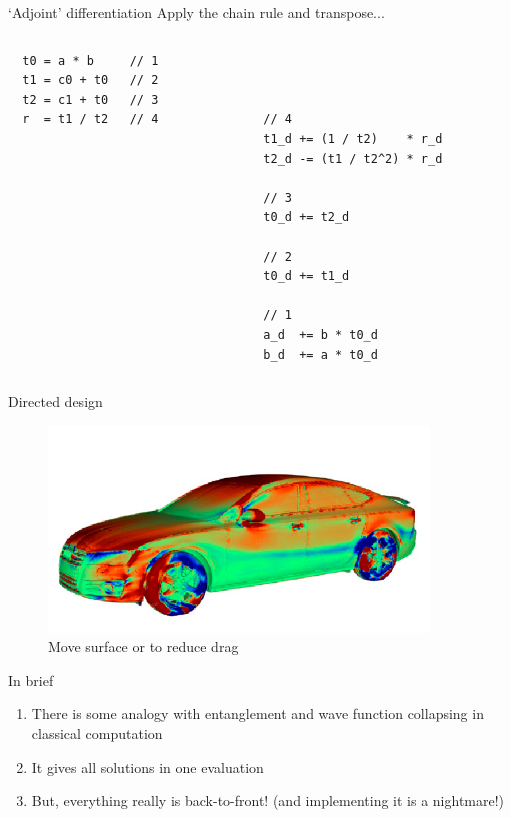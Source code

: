 \documentclass[xcolor=dvipsnames]{beamer}
\def\redcolor{\color{red}}
\def\bluecolor{\color{blue}}
\begin{document}
\begin{frame}[fragile]{`Adjoint' differentiation}
  Apply the chain rule and transpose...
  \begin{columns}[T] %
    \begin{column}{.49\textwidth}
      \begin{lstlisting}
  t0 = a * b     // 1
  t1 = c0 + t0   // 2
  t2 = c1 + t0   // 3
  r  = t1 / t2   // 4
  \end{lstlisting}
    \end{column}%
    \hfill%
    \begin{column}{0.49\textwidth}
        \begin{lstlisting}



  // 4
  t1_d += (1 / t2)    * r_d
  t2_d -= (t1 / t2^2) * r_d

  // 3
  t0_d += t2_d

  // 2
  t0_d += t1_d

  // 1
  a_d  += b * t0_d
  b_d  += a * t0_d
  \end{lstlisting}
    \end{column}%
  \end{columns}
\end{frame}


\begin{frame}{Directed design}
\begin{figure}
  \centering
  \caption {Move surface {\redcolor{in}} or {\bluecolor{out}} to reduce drag}
  \includegraphics[width=0.9\textwidth]{cfd_audi_sensitivity}
\end{figure}
\end{frame}


\begin{frame}{In brief}
  \begin{enumerate}
  \item There is some analogy with entanglement and wave function collapsing in classical computation\vspace{5mm}
  \item It gives all solutions in one evaluation\vspace{5mm}
  \item But, everything really is back-to-front! (and implementing it is a nightmare!)\vspace{5mm}
  \end{enumerate}
\end{frame}
\end{document}
